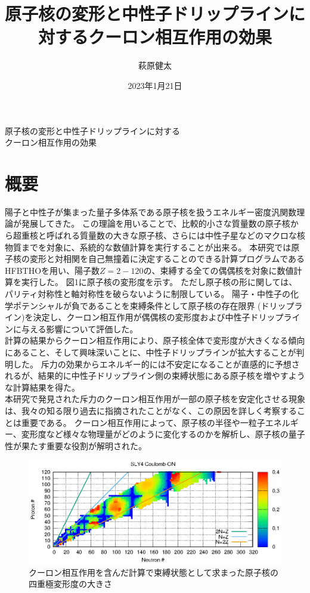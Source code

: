 \documentclass[10pt]{jarticle}
\title{原子核の変形と中性子ドリップラインに対するクーロン相互作用の効果}
\author{萩原健太}
\date{2023年1月21日}
\begin{document}
\begin{center}
  {\Large
    原子核の変形と中性子ドリップラインに対する\\
    クーロン相互作用の効果
  }
\end{center}


\section*{概要}
陽子と中性子が集まった量子多体系である原子核を扱うエネルギー密度汎関数理論が発展してきた。
この理論を用いることで、比較的小さな質量数の原子核から超重核と呼ばれる質量数の大きな原子核、さらには中性子星などのマクロな核物質までを対象に、系統的な数値計算を実行することが出来る。
本研究では原子核の変形と対相関を自己無撞着に決定することのできる計算プログラムであるHFBTHOを用い、陽子数$Z=2-120$の、束縛する全ての偶偶核を対象に数値計算を実行した。
図1に原子核の変形度を示す。
ただし原子核の形に関しては、パリティ対称性と軸対称性を破らないように制限している。
陽子・中性子の化学ポテンシャルが負であることを束縛条件として原子核の存在限界 (ドリップライン)を決定し、クーロン相互作用が偶偶核の変形度および中性子ドリップラインに与える影響について評価した。\\
計算の結果からクーロン相互作用により、原子核全体で変形度が大きくなる傾向にあること、そして興味深いことに、中性子ドリップラインが拡大することが判明した。
斥力の効果からエネルギー的には不安定になることが直感的に予想されるが、結果的に中性子ドリップライン側の束縛状態にある原子核を増やすような計算結果を得た。\\
本研究で発見された斥力のクーロン相互作用が一部の原子核を安定化させる現象は、我々の知る限り過去に指摘されたことがなく、この原因を詳しく考察することは重要である。
クーロン相互作用によって、原子核の半径や一粒子エネルギー、変形度など様々な物理量がどのように変化するのかを解析し、原子核の量子性が果たす重要な役割が解明された。
\begin{figure}[H]
  \centering
  \includegraphics{../SLY4_ON.eps}
  \setlength\floatsep{0pt}
  \setlength\intextsep{0pt} 
  \setlength\textfloatsep{0pt}
  \caption{クーロン相互作用を含んだ計算で束縛状態として求まった原子核の四重極変形度の大きさ}
  \label{fig:SLY4_deformation}
\end{figure}
\end{document}
